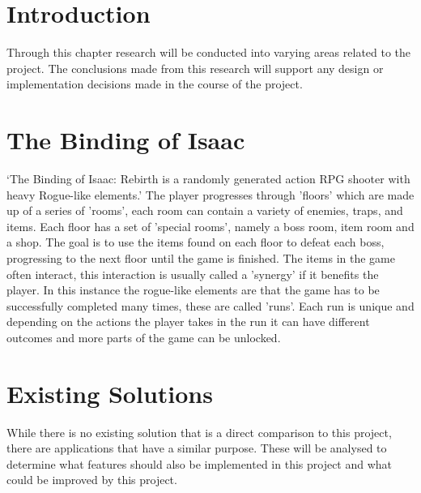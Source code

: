 \section{Introduction}
Through this chapter research will be conducted into varying areas related to the project. The conclusions made from 
this research will support any design or implementation decisions made in the course of the project.
\section{The Binding of Isaac}
`The Binding of Isaac: Rebirth is a randomly generated action RPG shooter with heavy Rogue-like elements.'\cite*{BindingIsaacRebirtha}
The player progresses through 'floors' which are made up of a series of 'rooms', each room can contain a variety of enemies, traps, and items.
Each floor has a set of 'special rooms', namely a boss room, item room and a shop. The goal is to use the items found on each floor to defeat each boss,
progressing to the next floor until the game is finished. The items in the game often interact, this interaction is usually called a 'synergy' if it benefits the player.
In this instance the rogue-like elements are that the game has to be successfully completed many times, these are called 'runs'. Each run is unique and depending on the 
actions the player takes in the run it can have different outcomes and more parts of the game can be unlocked.
\section{Existing Solutions}
While there is no existing solution that is a direct comparison to this project, there are applications that have a 
similar purpose. These will be analysed to determine what features should also be implemented in this project and what 
could be improved by this project.
